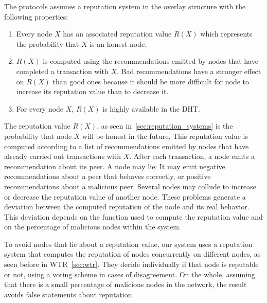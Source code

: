 




The protocols assumes a reputation system in the overlay structure with the following properties:
\begin{enumerate}
  \item Every node $X$ has an associated reputation value $R(X)$
  which represents the probability that $X$ is an honest node.
  \item $R(X)$ is computed using the recommendations emitted
  by nodes that have completed a transaction with $X$. Bad
  recommendations have a stronger effect on $R(X)$ than
  good ones because it should be more difficult for node to
  increase its reputation value than to decrease it.
  \item For every node $X$, $R(X)$ is highly available in the DHT.
\end{enumerate}

The reputation value $R(X)$, as seen in~\ref{sec:reputation_systems} is the probability that node $X$ will
be honest in the future. This reputation value is computed
according to a list of recommendations emitted by nodes that
have already carried out transactions with $X$.
After each transaction, a node emits a recommendation
about its peer. A node may lie: It may emit negative
recommendations about a peer that behaves correctly, or
positive recommendations about a malicious peer. Several nodes
may collude to increase or decrease the reputation value of
another node. These problems generate a deviation between
the computed reputation of the node and its real behavior. This deviation
depends on the function used to
compute the reputation value and on the percentage of malicious
nodes within the system.

To avoid nodes that lie about a reputation value, our system uses a reputation
system that computes the reputation of nodes concurrently on different nodes, as seen before in WTR~\ref{sec:wtr}.
They decide individually if that node is reputable or not, using a voting
scheme in cases of disagreement. On the whole, assuming that there is a small
percentage of malicious nodes in the network, the result avoids
false statements about reputation.

